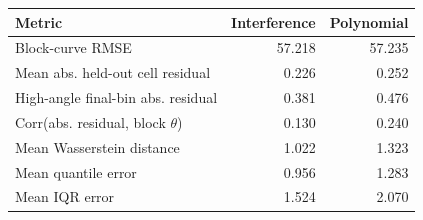 \begin{tabular}{lrr}
\toprule
Metric & Interference & Polynomial \\
\midrule
Block-curve RMSE & 57.218 & 57.235 \\
Mean abs. held-out cell residual & 0.226 & 0.252 \\
High-angle final-bin abs. residual & 0.381 & 0.476 \\
Corr(abs. residual, block $\theta$) & 0.130 & 0.240 \\
Mean Wasserstein distance & 1.022 & 1.323 \\
Mean quantile error & 0.956 & 1.283 \\
Mean IQR error & 1.524 & 2.070 \\
\bottomrule
\end{tabular}
